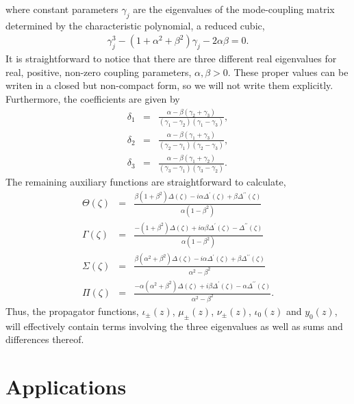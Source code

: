 \documentclass[9pt,twocolumn,twoside]{osajnl}
\begin{document}
where constant parameters  $\gamma_{j}$ are the eigenvalues of the mode-coupling matrix determined by the characteristic polynomial, a reduced cubic,
\begin{eqnarray}
\gamma_{j}^{3} - (1+ \alpha^{2} + \beta^{2}) \gamma_{j} - 2 \alpha \beta = 0. \label{eq:poly}
\end{eqnarray}
It is straightforward to notice that there are three different real eigenvalues for real, positive, non-zero coupling parameters, $\alpha, \beta > 0$.
These proper values can be writen in a closed but non-compact form, so we will not write them explicitly.
Furthermore, the coefficients are given by
\begin{eqnarray}
\delta_{1} &=& \frac{\alpha-\beta(\gamma_2+\gamma_3)}{(\gamma_1-\gamma_2)(\gamma_1-\gamma_3)},\\
\delta_{2} &=& \frac{\alpha-\beta(\gamma_1+\gamma_3)}{(\gamma_2-\gamma_1)(\gamma_2-\gamma_3)},\\
\delta_{3} &=& \frac{\alpha-\beta(\gamma_1+\gamma_2)}{(\gamma_3-\gamma_1)(\gamma_3-\gamma_2)}. 
\end{eqnarray}  
The remaining auxiliary functions are straightforward to calculate, 
\begin{eqnarray}
\Theta(\zeta)&=& \frac{\beta(1+\beta^2)\Delta(\zeta) - i \alpha\Delta^{\prime}(\zeta)+\beta\Delta^{\prime\prime}(\zeta)}
	{\alpha(1-\beta^2)}  \\
\Gamma(\zeta)&=& \frac{-(1+\beta^2)\Delta(\zeta) +i \alpha\beta\Delta^{\prime}(\zeta)-\Delta^{\prime\prime}(\zeta)}
	{\alpha(1-\beta^2)} \\
\Sigma(\zeta)&=& \frac{\beta(\alpha^2+\beta^2)\Delta(\zeta) -i \alpha\Delta^{\prime}(\zeta)+\beta\Delta^{\prime\prime}(\zeta)}
	{\alpha^2-\beta^2}  \\
\Pi(\zeta)&=& \frac{-\alpha(\alpha^2+\beta^2)\Delta(\zeta) +i \beta\Delta^{\prime}(\zeta)-\alpha\Delta^{\prime\prime}(\zeta)}
	{\alpha^2-\beta^2}.
\end{eqnarray} 
Thus, the propagator functions, $\iota_{\pm}(z)$, $\mu_{\pm}(z)$, $\nu_{\pm}(z)$, $\iota_{0}(z)$ and $y_{0}(z)$, will effectively contain terms involving the three eigenvalues as well as sums and differences thereof.



\section{Applications}
\end{document}
